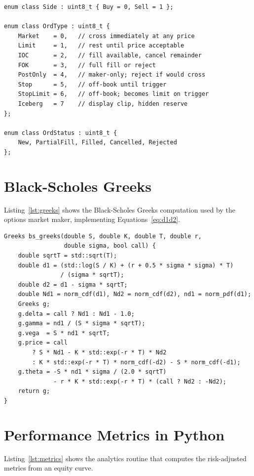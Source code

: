 \documentclass[12pt,oneside,a4paper]{report}
\begin{document}
\begin{lstlisting}[style=cppstyle,caption={Order type and side enumerations},label={lst:ordertypes}]
enum class Side : uint8_t { Buy = 0, Sell = 1 };

enum class OrdType : uint8_t {
    Market    = 0,   // cross immediately at any price
    Limit     = 1,   // rest until price acceptable
    IOC       = 2,   // fill available, cancel remainder
    FOK       = 3,   // full fill or reject
    PostOnly  = 4,   // maker-only; reject if would cross
    Stop      = 5,   // off-book until trigger
    StopLimit = 6,   // off-book; becomes limit on trigger
    Iceberg   = 7    // display clip, hidden reserve
};

enum class OrdStatus : uint8_t {
    New, PartialFill, Filled, Cancelled, Rejected
};
\end{lstlisting}

\section{Black-Scholes Greeks}

Listing~\ref{lst:greeks} shows the Black-Scholes Greeks computation used by the options market maker, implementing Equations~\ref{eq:d1d2}.

\begin{lstlisting}[style=cppstyle,caption={Black-Scholes Greeks computation},label={lst:greeks}]
Greeks bs_greeks(double S, double K, double T, double r,
                 double sigma, bool call) {
    double sqrtT = std::sqrt(T);
    double d1 = (std::log(S / K) + (r + 0.5 * sigma * sigma) * T)
                / (sigma * sqrtT);
    double d2 = d1 - sigma * sqrtT;
    double Nd1 = norm_cdf(d1), Nd2 = norm_cdf(d2), nd1 = norm_pdf(d1);
    Greeks g;
    g.delta = call ? Nd1 : Nd1 - 1.0;
    g.gamma = nd1 / (S * sigma * sqrtT);
    g.vega  = S * nd1 * sqrtT;
    g.price = call
        ? S * Nd1 - K * std::exp(-r * T) * Nd2
        : K * std::exp(-r * T) * norm_cdf(-d2) - S * norm_cdf(-d1);
    g.theta = -S * nd1 * sigma / (2.0 * sqrtT)
              - r * K * std::exp(-r * T) * (call ? Nd2 : -Nd2);
    return g;
}
\end{lstlisting}

\section{Performance Metrics in Python}

Listing~\ref{lst:metrics} shows the analytics routine that computes the risk-adjusted metrics from an equity curve.
\end{document}
